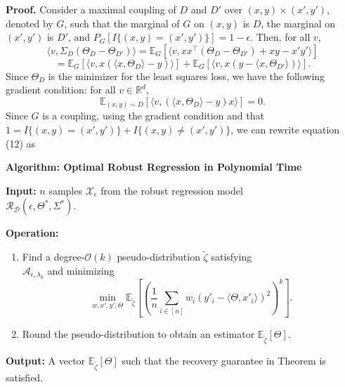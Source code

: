 \documentclass[preprint,11pt]{elsarticle}
\begin{document}
\textbf{Proof.} Consider a maximal coupling of \(D\) and \(D'\) over \((x, y) \times (x', y')\), denoted by \(G\), such that the marginal of \(G\) on \((x, y)\) is \(D\), the marginal on \((x', y')\) is \(D'\), and \(P_G \left[ I \{ (x, y) = (x', y') \} \right] = 1 - \epsilon\). Then, for all \(v\),
\[
\langle v, \Sigma_D (\Theta_D - \Theta_{D'}) \rangle = \mathbb{E}_G \left[ \langle v, x x^\top (\Theta_D - \Theta_{D'}) + x y - x' y' \rangle \right]
\]
\[
= \mathbb{E}_G \left[ \langle v, x (\langle x, \Theta_D \rangle - y) \rangle \right]
+ \mathbb{E}_G \left[ \langle v, x (y - \langle x, \Theta_{D'} \rangle) \rangle \right].
\]
Since \(\Theta_D\) is the minimizer for the least squares loss, we have the following gradient condition: for all \(v \in \mathbb{R}^d\),
\[
\mathbb{E}_{(x, y) \sim D} \left[ \langle v, (\langle x, \Theta_D \rangle - y) x \rangle \right] = 0.
\]
Since \(G\) is a coupling, using the gradient condition and that \(1 = I \{ (x, y) = (x', y') \} + I \{ (x, y) \ne (x', y') \}\), we can rewrite equation (12) as


\begin{mdframed}
  \noindent
  \textbf{Algorithm: Optimal Robust Regression in Polynomial Time}\par
  \hspace{2em}\textbf{Input:} $n$ samples $\mathcal{X}_{\epsilon}$ from the robust regression model \\
     $\mathcal{R}_{\mathcal{D}}(\epsilon, \Theta^*, \Sigma^*)$.

  \hspace{4em}\textbf{Operation:}\vspace{0.5em}\hspace{5em}
  \begin{enumerate}
   \item Find a degree-$\mathcal{O}(k)$ pseudo-distribution $\tilde{\zeta}$ satisfying \\
   \quad  $\mathcal{A}_{\epsilon, \lambda_k}$ and minimizing
    \[
    \min_{w, x', y', \Theta} \mathbb{E}_{\tilde{\zeta}}\left[ \left( \frac{1}{n} \sum_{i \in [n]} w_i \left( y'_i - \langle \Theta, x'_i \rangle \right)^2 \right)^{k} \right].
    \]
    \item Round the pseudo-distribution to obtain an estimator $\mathbb{E}_{\tilde{\zeta}}[\Theta]$.
  \end{enumerate}

  \textbf{Output:} A vector $\mathbb{E}_{\tilde{\zeta}}[\Theta]$ such that the recovery guarantee in Theorem \cite{xu2013outlier} is satisfied.
\end{mdframed}
\end{document}
